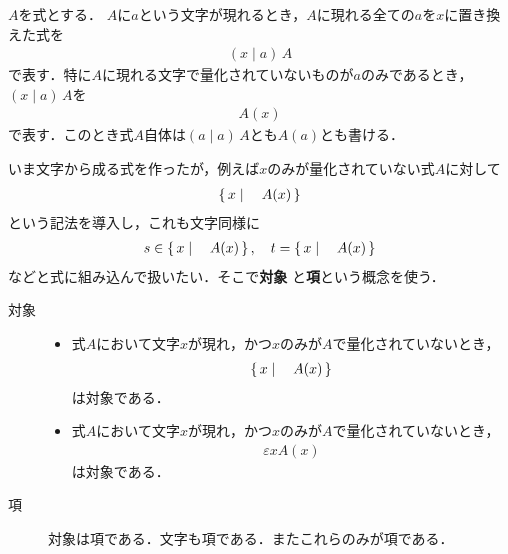 	
	$A$を式とする．
	$A$に$a$という文字が現れるとき，$A$に現れる全ての$a$を$x$に置き換えた式を
	\begin{align}
		(x \mid a)\, A
	\end{align}
	で表す．特に$A$に現れる文字で量化されていないものが$a$のみであるとき，
	$(x \mid a)\, A$を
	\begin{align}
		A(x)
	\end{align}
	で表す．このとき式$A$自体は$(a \mid a)\, A$とも$A(a)$とも書ける．
	
	いま文字から成る式を作ったが，例えば$x$のみが量化されていない式$A$に対して
	\begin{align}
		\left\{\, x \mid \quad A(x)\, \right\}
	\end{align}
	という記法を導入し，これも文字同様に
	\begin{align}
		s \in \left\{\, x \mid \quad A(x)\, \right\},\quad t = \left\{\, x \mid \quad A(x)\, \right\}
	\end{align}
	などと式に組み込んで扱いたい．そこで{\bf 対象}
	と{\bf 項}という概念を使う．
	
	\begin{description}
		\item[対象]
			\begin{itemize}
				\item 式$A$において文字$x$が現れ，かつ$x$のみが$A$で量化されていないとき，
					\begin{align}
						\left\{\, x \mid \quad A(x)\, \right\}
					\end{align}
					は対象である．
					
				\item 式$A$において文字$x$が現れ，かつ$x$のみが$A$で量化されていないとき，
					\begin{align}
						\varepsilon x A(x)
					\end{align}
					は対象である．
			\end{itemize}
			
		\item[項] 対象は項である．文字も項である．またこれらのみが項である．
	\end{description}
	
